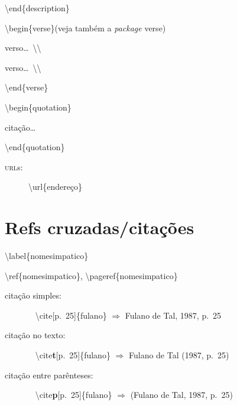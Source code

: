 \documentclass[11pt,twoside,english,brazilian]{article}
\begin{document}
\begin{multicols}{3}
\textbackslash{}end\{description\}


\vspace{\baselineskip}


\textbackslash{}begin\{verse\}\quad (veja também a \textit{package} \textsf{verse})

\quad verso\dots\ \textbackslash\textbackslash

\quad verso\dots\ \textbackslash\textbackslash

\textbackslash{}end\{verse\}


\vspace{\baselineskip}


\textbackslash{}begin\{quotation\}

\quad citação\dots

\textbackslash{}end\{quotation\}


\vspace{\baselineskip}


\begin{description}
    \item[\textsc{url}s:] \textbackslash{}url\{endereço\}
\end{description}

\section*{Refs cruzadas/citações}

\textbackslash{}label\{nomesimpatico\}

\textbackslash{}ref\{nomesimpatico\},
\textbackslash{}pageref\{nomesimpatico\}


\vspace{\baselineskip}


\begin{description}
\item[citação simples:]~\vspace{2pt}\newline
    \null\quad\textbackslash{}cite[p.~25]\{fulano\} $\Rightarrow$ Fulano de Tal, 1987, p.~25\vspace{6pt}

  \item[citação no texto:]~\vspace{2pt}\newline
    \null\quad\textbackslash{}cite\textbf{t}[p.~25]\{fulano\} $\Rightarrow$ Fulano de Tal (1987, p.~25)\vspace{6pt}

  \item[citação entre parênteses:]~\vspace{2pt}\newline
    \null\quad\textbackslash{}cite\textbf{p}[p.~25]\{fulano\} $\Rightarrow$ (Fulano de Tal, 1987, p.~25)
\end{description}


\end{multicols}
\end{document}
